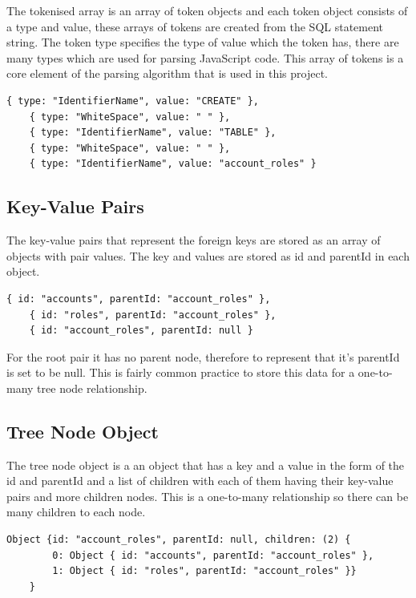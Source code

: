 The tokenised array is an array of token objects and each token object consists of a type and value, these arrays of tokens are created from the SQL statement string. The token type specifies the type of value which the token has, there are many types which are used for parsing JavaScript code. This array of tokens is a core element of the parsing algorithm that is used in this project.

 \begin{lstlisting}[style=JavaScript, caption={Tokenised array of tokens from a part of a simple input of an "CREATE TABLE" statement.}]
	{ type: "IdentifierName", value: "CREATE" },
	{ type: "WhiteSpace", value: " " },
	{ type: "IdentifierName", value: "TABLE" },
	{ type: "WhiteSpace", value: " " },
	{ type: "IdentifierName", value: "account_roles" }
\end{lstlisting}

\subsection{Key-Value Pairs}

The key-value pairs that represent the foreign keys are stored as an array of objects with pair values. The key and values are stored as id and parentId in each object.

 \begin{lstlisting}[style=JavaScript, caption={Representation of the array of objects containing the key-value pairs.}]
	{ id: "accounts", parentId: "account_roles" },
	{ id: "roles", parentId: "account_roles" },
	{ id: "account_roles", parentId: null }
\end{lstlisting}

For the root pair it has no parent node, therefore to represent that it's parentId is set to be null. This is fairly common practice to store this data for a one-to-many tree node relationship.

\subsection{Tree Node Object}

The tree node object is a an object that has a key and a value in the form of the id and parentId and a list of children with each of them having their key-value pairs and more children nodes. This is a one-to-many relationship so there can be many children to each node.

 \begin{lstlisting}[style=JavaScript, caption={}]
 	Object {id: "account_roles", parentId: null, children: (2) {
 		0: Object { id: "accounts", parentId: "account_roles" },
 		1: Object { id: "roles", parentId: "account_roles" }}
 	}
\end{lstlisting}

